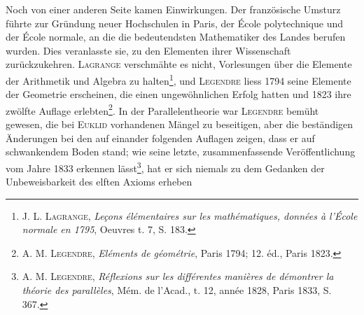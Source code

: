 \par
Noch von einer anderen Seite kamen Einwirkungen. Der französische
Umsturz führte zur Gründung neuer Hochschulen in Paris, der École polytechnique
und der École normale, an die die bedeutendsten Mathematiker des
Landes berufen wurden. Dies veranlasste sie, zu den Elementen ihrer Wissenschaft
zurückzukehren. \textsc{Lagrange} verschmähte es nicht, Vorlesungen über
die Elemente der Arithmetik und Algebra zu halten\footnote{J. L. \textsc{Lagrange}, \textit{Leçons élémentaires sur les mathématiques, données à l’École normale en 1795}, Oeuvres t. 7, S. 183.}, und \textsc{Legendre} liess
1794 seine Elemente der Geometrie erscheinen, die einen ungewöhnlichen
Erfolg hatten und 1823 ihre zwölfte Auflage erlebten\footnote{A. M. \textsc{Legendre}, \textit{Eléments de géométrie}, Paris 1794; 12. éd., Paris 1823.}. In der Parallelentheorie
war \textsc{Legendre} bemüht gewesen, die bei \textsc{Euklid} vorhandenen Mängel
zu beseitigen, aber die beständigen Änderungen bei den auf einander folgenden
Auflagen zeigen, dass er auf schwankendem Boden stand; wie seine letzte,
zusammenfassende Veröffentlichung vom Jahre 1833 erkennen lässt\footnote{A. M. \textsc{Legendre}, \textit{Réflexions sur les différentes manières de démontrer la théorie des parallèles}, Mém. de l’Acad., t. 12, année 1828, Paris 1833, S. 367.}, hat er
sich niemals zu dem Gedanken der Unbeweisbarkeit des elften Axioms erheben
